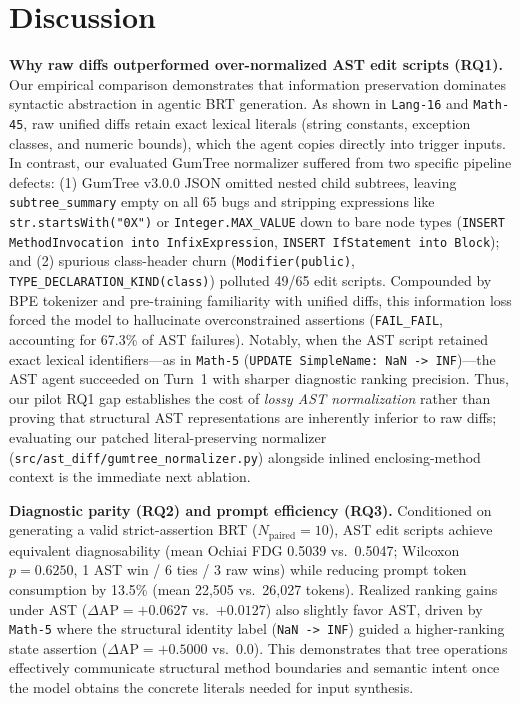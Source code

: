 \documentclass[12pt, a4paper]{article}
\begin{document}
\section{Discussion}\label{sec:discussion}

\textbf{Why raw diffs outperformed over-normalized AST edit scripts (RQ1).}
Our empirical comparison demonstrates that information preservation dominates syntactic abstraction in agentic BRT generation.
As shown in \texttt{Lang-16} and \texttt{Math-45}, raw unified diffs retain exact lexical literals (string constants, exception classes, and numeric bounds), which the agent copies directly into trigger inputs.
In contrast, our evaluated GumTree normalizer suffered from two specific pipeline defects: (1) GumTree v3.0.0 JSON omitted nested child subtrees, leaving \texttt{subtree\_summary} empty on all 65 bugs and stripping expressions like \texttt{str.startsWith("0X")} or \texttt{Integer.MAX\_VALUE} down to bare node types (\texttt{INSERT MethodInvocation into InfixExpression}, \texttt{INSERT IfStatement into Block}); and (2) spurious class-header churn (\texttt{Modifier(public)}, \texttt{TYPE\_DECLARATION\_KIND(class)}) polluted 49/65 edit scripts.
Compounded by BPE tokenizer and pre-training familiarity with unified diffs, this information loss forced the model to hallucinate overconstrained assertions (\texttt{FAIL\_FAIL}, accounting for 67.3\% of AST failures).
Notably, when the AST script retained exact lexical identifiers---as in \texttt{Math-5} (\texttt{UPDATE SimpleName: NaN -> INF})---the AST agent succeeded on Turn~1 with sharper diagnostic ranking precision.
Thus, our pilot RQ1 gap establishes the cost of \emph{lossy AST normalization} rather than proving that structural AST representations are inherently inferior to raw diffs; evaluating our patched literal-preserving normalizer (\texttt{src/ast\_diff/gumtree\_normalizer.py}) alongside inlined enclosing-method context is the immediate next ablation.

\textbf{Diagnostic parity (RQ2) and prompt efficiency (RQ3).}
Conditioned on generating a valid strict-assertion BRT ($N_{\text{paired}} = 10$), AST edit scripts achieve equivalent diagnosability (mean Ochiai FDG 0.5039 vs.\ 0.5047; Wilcoxon $p = 0.6250$, 1 AST win / 6 ties / 3 raw wins) while reducing prompt token consumption by 13.5\% (mean 22,505 vs.\ 26,027 tokens).
Realized ranking gains under AST ($\Delta\text{AP} = +0.0627$ vs.\ $+0.0127$) also slightly favor AST, driven by \texttt{Math-5} where the structural identity label (\texttt{NaN -> INF}) guided a higher-ranking state assertion ($\Delta\text{AP} = +0.5000$ vs.\ $0.0$).
This demonstrates that tree operations effectively communicate structural method boundaries and semantic intent once the model obtains the concrete literals needed for input synthesis.
\end{document}

